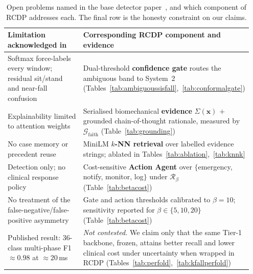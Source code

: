 \begin{table}[!t]
\centering
\caption{Open problems named in the base detector paper~\cite{bhatti2025beyond}, and which component of RCDP addresses each. The final row is the honesty constraint on our claims.}
\label{tab:bhattigaps}
\begin{tabular}{@{}p{0.45\linewidth} p{0.50\linewidth}@{}}
\toprule
Limitation acknowledged in~\cite{bhatti2025beyond} & Corresponding RCDP component and evidence \\
\midrule
Softmax force-labels every window; residual sit/stand and near-fall confusion
 & Dual-threshold \textbf{confidence gate} routes the ambiguous band to System~2 (Tables~\ref{tab:ambiguoussisfall},~\ref{tab:conformalgate}) \\
Explainability limited to attention weights
 & Serialised biomechanical \textbf{evidence} $\Sigma(\mathbf{x})$ $+$ grounded chain-of-thought rationale, measured by $\mathcal{G}_{\mathrm{faith}}$ (Table~\ref{tab:grounding}) \\
No case memory or precedent reuse
 & MiniLM \textbf{$k$-NN retrieval} over labelled evidence strings; ablated in Tables~\ref{tab:ablation},~\ref{tab:knnk} \\
Detection only; no clinical response policy
 & Cost-sensitive \textbf{Action Agent} over $\{$emergency, notify, monitor, log$\}$ under $\mathcal{R}_\beta$ (Table~\ref{tab:betacost}) \\
No treatment of the false-negative/false-positive asymmetry
 & Gate and action thresholds calibrated to $\beta{=}10$; sensitivity reported for $\beta\in\{5,10,20\}$ (Table~\ref{tab:betacost}) \\
\midrule
Published result: $36$-class multi-phase F1 $\approx0.98$ at $\approx20$\,ms
 & \emph{Not contested.} We claim only that the same Tier-1 backbone, frozen, attains better recall and lower clinical cost under uncertainty when wrapped in RCDP (Tables~\ref{tab:perfold},~\ref{tab:kfallperfold}) \\
\bottomrule
\end{tabular}
\end{table}
